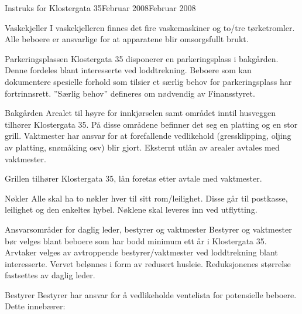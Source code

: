 \begin{instruks}{Instruks for Klostergata 35}{Februar 2008}{Februar 2008}
    \begin{instruksledd}{Vaskekjeller}
        I vaskekjelleren finnes det fire vaskemaskiner og to/tre tørketromler. Alle
        beboere er ansvarlige for at apparatene blir
        omsorgsfullt brukt.
    \end{instruksledd}

    \begin{instruksledd}{Parkeringsplassen}
        Klostergata 35 disponerer en parkeringsplass i bakgården. Denne fordeles blant
        interesserte ved loddtrekning. Beboere
        som kan dokumentere spesielle forhold som tilsier et særlig behov for
        parkeringsplass har fortrinnsrett. ”Særlig
        behov” defineres om nødvendig av Finansstyret.
    \end{instruksledd}

    \begin{instruksledd}{Bakgården}
        Arealet til høyre for innkjørselen samt området inntil husveggen tilhører
        Klostergata 35. På disse områdene befinner
        det seg en platting og en stor grill. Vaktmester har ansvar for at forefallende
        vedlikehold (gressklipping, oljing av
        platting, snømåking osv) blir gjort. Eksternt utlån av arealer avtales med
        vaktmester.

        Grillen tilhører Klostergata 35, lån foretas etter avtale med vaktmester.
    \end{instruksledd}

    \begin{instruksledd}{Nøkler}
        Alle skal ha to nøkler hver til sitt rom/leilighet. Disse går til postkasse,
        leilighet og den enkeltes hybel. Nøklene skal
        leveres inn ved utflytting.
    \end{instruksledd}

    \begin{instruksledd}{Ansvarsområder for daglig leder, bestyrer og vaktmester}
        Bestyrer og vaktmester bør velges blant beboere som har bodd minimum ett år i
        Klostergata 35. Arvtaker velges av
        avtroppende bestyrer/vaktmester ved loddtrekning blant interesserte. Vervet
        belønnes i form av redusert husleie.
        Reduksjonenes størrelse fastsettes av daglig leder.
    \end{instruksledd}

    \begin{instruksledd}{Bestyrer}
        Bestyrer har ansvar for å vedlikeholde ventelista for potensielle beboere. Dette
        innebærer:
        

\end{instruksledd}
\end{instruks}
